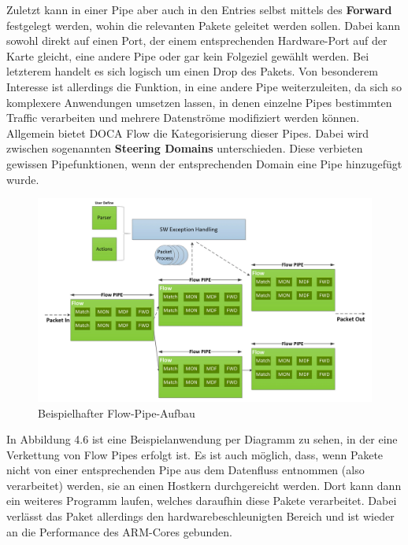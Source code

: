 Zuletzt kann in einer Pipe aber auch in den Entries selbst mittels des \textbf{Forward} festgelegt werden, wohin die relevanten Pakete geleitet werden sollen. Dabei kann sowohl direkt auf einen Port, der einem entsprechenden Hardware-Port auf der Karte gleicht, eine andere Pipe oder gar kein Folgeziel gewählt werden. Bei letzterem handelt es sich logisch um einen Drop des Pakets. Von besonderem Interesse ist allerdings die Funktion, in eine andere Pipe weiterzuleiten, da sich so komplexere Anwendungen umsetzen lassen, in denen einzelne Pipes bestimmten Traffic verarbeiten und mehrere Datenströme modifiziert werden können. Allgemein bietet DOCA Flow die Kategorisierung dieser Pipes. Dabei wird zwischen sogenannten \textbf{Steering Domains} unterschieden. Diese verbieten gewissen Pipefunktionen, wenn der entsprechenden Domain eine Pipe hinzugefügt wurde. 
\begin{figure}
    \centering
    \includegraphics[width=1\linewidth]{images/Screenshot 2025-04-30 at 11-16-05 DOCA Flow - NVIDIA Docs.png}
    \caption{Beispielhafter Flow-Pipe-Aufbau \cite{nvidia_doca_flow_v1_2}}
    \label{fig:enter-label}
\end{figure}

In Abbildung 4.6 ist eine Beispielanwendung per Diagramm zu sehen, in der eine Verkettung von Flow Pipes erfolgt ist. Es ist auch möglich, dass, wenn Pakete nicht von einer entsprechenden Pipe aus dem Datenfluss entnommen (also verarbeitet) werden, sie an einen Hostkern durchgereicht werden. Dort kann dann ein weiteres Programm laufen, welches daraufhin diese Pakete verarbeitet. Dabei verlässt das Paket allerdings den hardwarebeschleunigten Bereich und ist wieder an die Performance des ARM-Cores gebunden.
